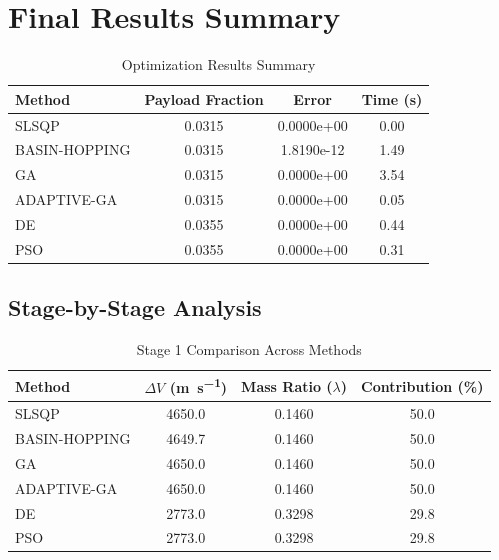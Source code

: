 \documentclass{article}
\begin{document}
\section{Final Results Summary}
\begin{table}[H]
\centering
\caption{Optimization Results Summary}
\begin{tabular}{lS[table-format=1.4]S[table-format=1.4e-1]S[table-format=1.2]}
\toprule
Method & {Payload Fraction} & {Error} & {Time (\si{\second})} \\
\midrule
SLSQP        & 0.0315 & 0.0000e+00 & 0.00 \\
BASIN-HOPPING & 0.0315 & 1.8190e-12 & 1.49 \\
GA           & 0.0315 & 0.0000e+00 & 3.54 \\
ADAPTIVE-GA  & 0.0315 & 0.0000e+00 & 0.05 \\
DE           & 0.0355 & 0.0000e+00 & 0.44 \\
PSO          & 0.0355 & 0.0000e+00 & 0.31 \\
\bottomrule
\end{tabular}
\end{table}

\subsection{Stage-by-Stage Analysis}


\begin{table}[H]
\centering
\caption{Stage 1 Comparison Across Methods}
\begin{tabular}{lS[table-format=4.1]S[table-format=1.4]S[table-format=3.1]}
\toprule
Method & {$\Delta V$ (\si{\meter\per\second})} & {Mass Ratio ($\lambda$)} & {Contribution (\%)} \\
\midrule
SLSQP        & 4650.0 & 0.1460 & 50.0 \\
BASIN-HOPPING & 4649.7 & 0.1460 & 50.0 \\
GA           & 4650.0 & 0.1460 & 50.0 \\
ADAPTIVE-GA  & 4650.0 & 0.1460 & 50.0 \\
DE           & 2773.0 & 0.3298 & 29.8 \\
PSO          & 2773.0 & 0.3298 & 29.8 \\
\bottomrule
\end{tabular}
\end{table}
\end{document}
